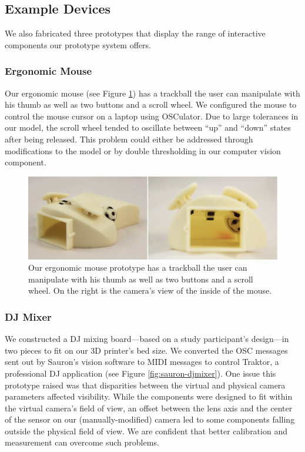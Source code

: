     \subsection{Example Devices}
    We also fabricated three prototypes that display the range of interactive components our prototype system offers.

        \subsubsection{Ergonomic Mouse}
        Our ergonomic mouse (see Figure \ref{fig:sauron-ergomouse}) has a trackball the user can manipulate with his thumb as well as two buttons and a scroll wheel. We configured the mouse to control the mouse cursor on a laptop using OSCulator. Due to large tolerances in our model, the scroll wheel tended to oscillate between ``up'' and ``down'' states after being released. This problem could either be addressed through modifications to the model or by double thresholding in our computer vision component.
        
        
\begin{figure}
\centering
\includegraphics[width=\textwidth]{figures/sauron/ergomouse.png}
\caption{Our ergonomic mouse prototype has a trackball the user can manipulate with his thumb as well as two buttons and a scroll wheel. On the right is the camera's view of the inside of the mouse.}
\label{fig:sauron-ergomouse}
\end{figure}

        \subsubsection{DJ Mixer}
        We constructed a DJ mixing board---based on a study participant's design---in two pieces to fit on our 3D printer's bed size. We converted the OSC messages sent out by Sauron's vision software to MIDI messages to control Traktor, a professional DJ application (see Figure \ref{fig:sauron-djmixer}). One issue this prototype raised was that disparities between the virtual and physical camera parameters affected visibility. While the components were designed to fit within the virtual camera's field of view, an offset between the lens axis and the center of the sensor on our (manually-modified) camera led to some components falling outside the physical field of view. We are confident that better calibration and measurement can overcome such problems.
        
